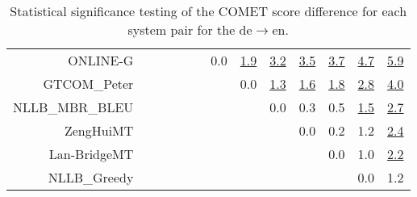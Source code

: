 \documentclass[11pt]{article}
\begin{document}
\begin{sidewaystable}
\begin{center}
{\begin{tabular}{rcccccccccccc}
ONLINE-G &    &  &  &  &  & \cellcolor{red!0} 0.0 & \cellcolor{red!70} \underline{1.9} & \cellcolor{red!70} \underline{3.2} & \cellcolor{red!70} \underline{3.5} & \cellcolor{red!70} \underline{3.7} & \cellcolor{red!70} \underline{4.7} & \cellcolor{red!70} \underline{5.9}\\ 
GTCOM\_Peter &  &  &  &  &  &  & \cellcolor{red!0} 0.0 & \cellcolor{red!70} \underline{1.3} & \cellcolor{red!70} \underline{1.6} & \cellcolor{red!70} \underline{1.8} & \cellcolor{red!70} \underline{2.8} & \cellcolor{red!70} \underline{4.0}\\ 
NLLB\_MBR\_BLEU &    &  &  &  &  &  &  & \cellcolor{red!0} 0.0 & \cellcolor{red!0} 0.3 & \cellcolor{red!0} 0.5 & \cellcolor{red!70} \underline{1.5} & \cellcolor{red!70} \underline{2.7}\\ 
ZengHuiMT &  &    &  &  &  &  &  &  & \cellcolor{red!0} 0.0 & \cellcolor{red!0} 0.2 & \cellcolor{red!50} 1.2 & \cellcolor{red!70} \underline{2.4}\\ 
Lan-BridgeMT &    &  &  &  &  &  &  &  &  & \cellcolor{red!0} 0.0 & \cellcolor{red!40} 1.0 & \cellcolor{red!70} \underline{2.2}\\ 
NLLB\_Greedy &    &  &  &  &  &  &  &  &  &  & \cellcolor{red!0} 0.0 & \cellcolor{red!60} 1.2\\ 
\bottomrule 
\end{tabular} }
\caption{Statistical significance testing of the COMET score difference for each system pair for the de$\rightarrow$en.} 
 \end{center} \end{sidewaystable} 
\end{document}

